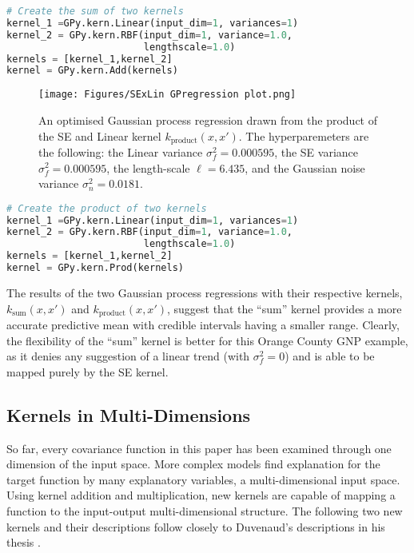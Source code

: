 \documentclass[12pt,a4paper]{article}
\begin{document}
\vspace{20pt}
\begin{lstlisting}[language=python, caption={Code of creating the sum of two kernels.}, label={lst:SE+Lin kernel}]
# Create the sum of two kernels
kernel_1 =GPy.kern.Linear(input_dim=1, variances=1)
kernel_2 = GPy.kern.RBF(input_dim=1, variance=1.0,
                        lengthscale=1.0)
kernels = [kernel_1,kernel_2]
kernel = GPy.kern.Add(kernels)
\end{lstlisting}

\begin{figure}[]
    \centering
    \texttt{[image: Figures/SExLin GPregression plot.png]}
    \caption{An optimised Gaussian process regression drawn from the product of the SE and Linear kernel \(k_{\text{product}}(x, x')\). The hyperparemeters are the following: the Linear variance \(\sigma_f^2 = 0.000595\), the SE variance \(\sigma_f^2 = 0.000595\), the length-scale \(\ell = 6.435\), and the Gaussian noise variance \(\sigma_n^2 = 0.0181\).}
    \label{fig:SE*Lin Gpregression}
\end{figure}

\vspace{20pt}
\begin{lstlisting}[language=python, caption={Code of creating the product of two kernels.}, label={lst:SE*Lin kernel}]
# Create the product of two kernels
kernel_1 =GPy.kern.Linear(input_dim=1, variances=1)
kernel_2 = GPy.kern.RBF(input_dim=1, variance=1.0,
                        lengthscale=1.0)
kernels = [kernel_1,kernel_2]
kernel = GPy.kern.Prod(kernels)
\end{lstlisting}

\newpage
The results of the two Gaussian process regressions with their respective kernels, \(k_{\text{sum}}(x, x')\) and \(k_{\text{product}}(x, x')\), suggest that the ``sum'' kernel provides a more accurate predictive mean with credible intervals having a smaller range. Clearly, the flexibility of the ``sum'' kernel is better for this Orange County GNP example, as it denies any suggestion of a linear trend (with \(\sigma_f^2 = 0\)) and is able to be mapped purely by the SE kernel.

\subsection{Kernels in Multi-Dimensions}
\label{sec:kernelsmulti}

So far, every covariance function in this paper has been examined through one dimension of the input space. More complex models find explanation for the target function by many explanatory variables, a multi-dimensional input space. Using kernel addition and multiplication, new kernels are capable of mapping a function to the input-output multi-dimensional structure. The following two new kernels and their descriptions follow closely to Duvenaud's descriptions in his thesis \citep{duvenaud2014automatic}.
\end{document}
